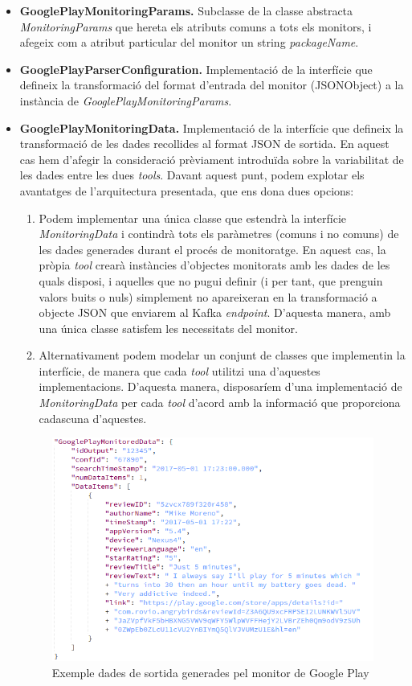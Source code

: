 \begin{itemize}
\item \textbf{GooglePlayMonitoringParams.} Subclasse de la classe abstracta \textit{MonitoringParams} que hereta els atributs comuns a tots els monitors, i afegeix com a atribut particular del monitor un string \textit{packageName}.
\item \textbf{GooglePlayParserConfiguration.} Implementació de la interfície que defineix la transformació del format d'entrada del monitor (JSONObject) a la instància de \textit{GooglePlayMonitoringParams}.
\item \textbf{GooglePlayMonitoringData.} Implementació de la interfície que defineix la transformació de les dades recollides al format JSON de sortida. En aquest cas hem d'afegir la consideració prèviament introduïda sobre la variabilitat de les dades entre les dues \textit{tools}. Davant aquest punt, podem explotar els avantatges de l'arquitectura presentada, que ens dona dues opcions:
\begin{enumerate}
\item Podem implementar una única classe que estendrà la interfície \textit{MonitoringData} i contindrà tots els paràmetres (comuns i no comuns) de les dades generades durant el procés de monitoratge. En aquest cas, la pròpia \textit{tool} crearà instàncies d'objectes monitorats amb les dades de les quals disposi, i aquelles que no pugui definir (i per tant, que prenguin valors buits o nuls) simplement no apareixeran en la transformació a objecte JSON que enviarem al Kafka \textit{endpoint}. D'aquesta manera, amb una única classe satisfem les necessitats del monitor.
\item Alternativament podem modelar un conjunt de classes que implementin la interfície, de manera que cada \textit{tool} utilitzi una d'aquestes implementacions. D'aquesta manera, disposaríem d'una implementació de \textit{MonitoringData} per cada \textit{tool} d'acord amb la informació que proporciona cadascuna d'aquestes.
\end{enumerate}
\begin{figure}[!h]
\centering
\includegraphics[width=14cm]{Figures/Figure13}
\decoRule
\caption[Exemple dades de sortida generades pel monitor de Google Play]{Exemple dades de sortida generades pel monitor de Google Play}
\label{fig:Figura13}
\end{figure}


\end{itemize}
